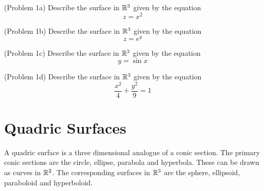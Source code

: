 \documentclass[handout]{ximera}
\begin{document}
\begin{center}
\end{center}

\begin{problem}(Problem 1a)
Describe the surface in $\mathbb R^3$ given by the equation
\[
z= x^2
\]
\end{problem}

\begin{problem}(Problem 1b)
Describe the surface in $\mathbb R^3$ given by the equation
\[
z= e^y
\]
\end{problem}

\begin{problem}(Problem 1c)
Describe the surface in $\mathbb R^3$ given by the equation
\[
y= \sin{x}
\]
\end{problem}

\begin{problem}(Problem 1d)
Describe the surface in $\mathbb R^3$ given by the equation
\[
\frac{x^2}{4} + \frac{y^2}{9} = 1
\]
\end{problem}



\section{Quadric Surfaces}
A quadric surface is a three dimensional analogue of a conic section.
The primary conic sections are the circle, ellipse, parabola and hyperbola. 
These can be drawn as curves in $\mathbb R^2$.
The corresponding surfaces in $\mathbb R^3$ are the sphere, ellipsoid, paraboloid and hyperboloid. 
\begin{image}
\end{image}


\begin{image}
\end{image}
\end{document}
